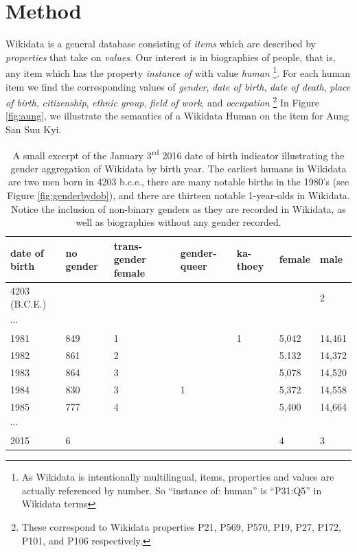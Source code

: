 \documentclass{sig-alternate-05-2015}
\begin{document}
\section{Method}

Wikidata is a general database consisting of \textit{items} which are described by \textit{properties} that take on \textit{values}. Our interest is in biographies of people, that is, any item which has the property \textit{instance of} with value \textit{human} \footnote{As Wikidata is intentionally multilingual, items, properties and values are actually referenced by number. So ``instance of: human'' is ``P31:Q5'' in Wikidata terms }. For each human item we find the corresponding values of \textit{gender}, \textit{date of birth}, \textit{date of death}, \textit{place of birth}, \textit{citizenship}, \textit{ethnic group}, \textit{field of work}, and \textit{occupation} \footnote{These correspond to Wikidata properties P21, P569, P570, P19, P27, P172, P101, and P106 respectively.} In Figure \ref{fig:aung}, we illustrate the semantics of a Wikidata Human on the item for Aung San Suu Kyi.
 
\begin{table}
\caption{A small excerpt of the January 3\textsuperscript{rd} 2016 date of birth indicator illustrating the gender aggregation of Wikidata by birth year. The earliest humans in Wikidata are two men born in 4203 b.c.e., there are many notable births in the 1980's (see Figure \ref{fig:genderbydob}), and there are thirteen notable 1-year-olds in Wikidata. Notice the inclusion of non-binary genders as they are recorded in Wikidata, as well as biographies without any gender recorded.}
\begin{tabular} {p{0.75cm}p{0.75cm}p{0.75cm}p{0.75cm}p{0.75cm}p{0.75cm}p{0.75cm}}
\toprule
date of birth & no gender & trans-gender female & gender-queer & ka-thoey & female & male \\
\midrule
4203 \small{(B.C.E.)} & & & & & & 2   \\ 
$\cdots$ &  &  &  & &  &    \\ 
1981 & 849 & 1 &  & 1 &5,042 & 14,461 \\ 
1982 & 861 & 2 &  & &5,132 & 14,372  \\ 
1983 & 864 & 3 &  & &5,078 & 14,520  \\ 
1984 & 830 & 3 & 1 & &5,372 & 14,558   \\ 
1985 & 777 & 4 &  & &5,400 & 14,664  \\ 
$\cdots$ &  &  &  & &  &    \\ 
2015 & 6 &  &  & & 4 & 3  \\ 
\bottomrule
\end{tabular}
\label{table:dob}
\end{table}
\end{document}
